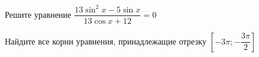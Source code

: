 \begin{ex}
	\begin{condition}
		\begin{enumcols}[label=\asbuk*)]
			\item Решите уравнение \( \dfrac{13\sin^2  x- 5\sin x}{13 \cos x +12} =0 \)
			\item Найдите все корни уравнения, принадлежащие отрезку \( \left[-3\pi;-\dfrac{3\pi}{2}\right] \)
		\end{enumcols}
	\end{condition}
\end{ex}